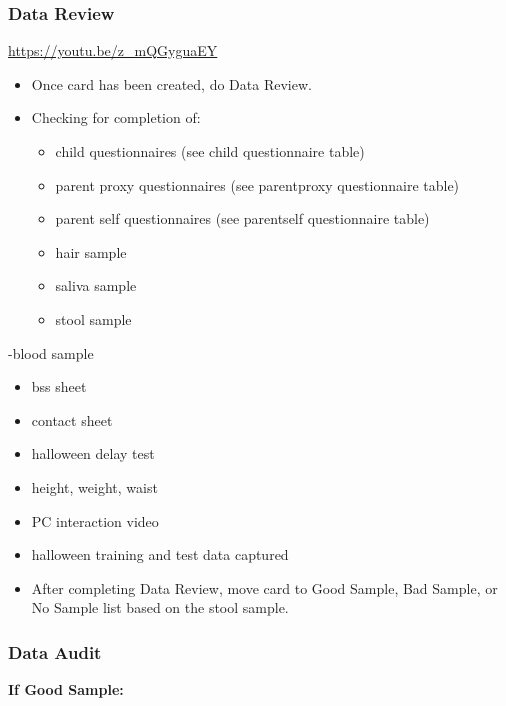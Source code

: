 \documentclass[]{book}
\begin{document}
\hypertarget{data-review-1}{%
\subsubsection{Data Review}\label{data-review-1}}

\url{https://youtu.be/z_mQGyguaEY}

\begin{itemize}
\item
  Once card has been created, do Data Review.
\item
  Checking for completion of:

  \begin{itemize}
  \item
    child questionnaires (see child questionnaire table)
  \item
    parent proxy questionnaires (see parentproxy questionnaire table)
  \item
    parent self questionnaires (see parentself questionnaire table)
  \item
    hair sample
  \item
    saliva sample
  \item
    stool sample
  \end{itemize}
\end{itemize}

-blood sample

\begin{itemize}
\item
  bss sheet
\item
  contact sheet
\item
  halloween delay test
\item
  height, weight, waist
\item
  PC interaction video
\item
  halloween training and test data captured
\item
  After completing Data Review, move card to Good Sample, Bad Sample, or No Sample list based on the stool sample.
\end{itemize}

\hypertarget{data-audit-1}{%
\subsubsection{Data Audit}\label{data-audit-1}}

\textbf{If Good Sample:}
\end{document}

